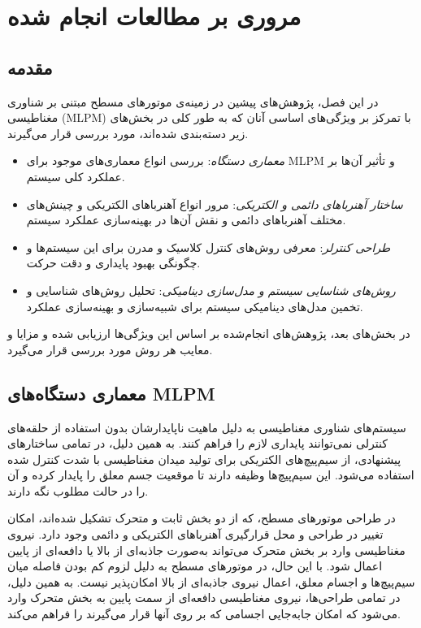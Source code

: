 \chapter{مروری بر مطالعات انجام شده}
\section{مقدمه}
در این فصل، پژوهش‌های پیشین در زمینه‌ی موتورهای مسطح مبتنی بر شناوری مغناطیسی (MLPM) با تمرکز بر ویژگی‌های اساسی آنان که به طور کلی در بخش‌های زیر دسته‌بندی شده‌اند، مورد بررسی قرار می‌گیرند. 
\begin{itemize}
	\item
		\textit{معماری دستگاه}:
بررسی انواع معماری‌های موجود برای MLPM و تأثیر آن‌ها بر عملکرد کلی سیستم.
	\item
		\textit{ساختار آهنرباهای دائمی و الکتریکی}:
مرور انواع آهنرباهای الکتریکی و چینش‌های مختلف آهنربا‌های دائمی و نقش آن‌ها در بهینه‌سازی عملکرد سیستم.
	\item
		\textit{طراحی کنترلر}:
معرفی روش‌های کنترل کلاسیک و مدرن برای این سیستم‌ها و چگونگی بهبود پایداری و دقت حرکت.
	\item
		\textit{روش‌های شناسایی سیستم و مدل‌سازی دینامیکی}:
تحلیل روش‌های شناسایی و تخمین مدل‌های دینامیکی سیستم برای شبیه‌سازی و بهینه‌سازی عملکرد.
\end{itemize}
در بخش‌های بعد، پژوهش‌های انجام‌شده بر اساس این ویژگی‌ها ارزیابی شده و مزایا و معایب هر روش مورد بررسی قرار می‌گیرد.

\section{معماری دستگاه‌های MLPM}
سیستم‌های شناوری مغناطیسی به دلیل ماهیت ناپایدارشان بدون استفاده از حلقه‌های کنترلی نمی‌توانند پایداری لازم را فراهم کنند. به همین دلیل، در تمامی ساختارهای پیشنهادی، از سیم‌پیچ‌های الکتریکی برای تولید میدان مغناطیسی با شدت کنترل ‌شده استفاده می‌شود. این سیم‌پیچ‌ها وظیفه دارند تا موقعیت جسم معلق را پایدار کرده و آن را در حالت مطلوب نگه ‌دارند.

در طراحی موتورهای مسطح، که از دو بخش ثابت
 و متحرک
تشکیل شده‌اند، امکان تغییر در طراحی و محل قرارگیری آهنرباهای الکتریکی و دائمی وجود دارد. نیروی مغناطیسی وارد بر بخش متحرک می‌تواند به‌صورت جاذبه‌ای از بالا یا دافعه‌ای از پایین اعمال شود. با این حال، در موتورهای مسطح به دلیل لزوم کم بودن فاصله میان سیم‌پیچ‌ها و اجسام معلق، اعمال نیروی جاذبه‌ای از بالا امکان‌پذیر نیست. به همین دلیل، در تمامی طراحی‌ها، نیروی مغناطیسی دافعه‌ای از سمت پایین به بخش متحرک وارد می‌شود که امکان جابه‌جایی اجسامی که بر روی آنها قرار می‌گیرند را فراهم می‌کند.

